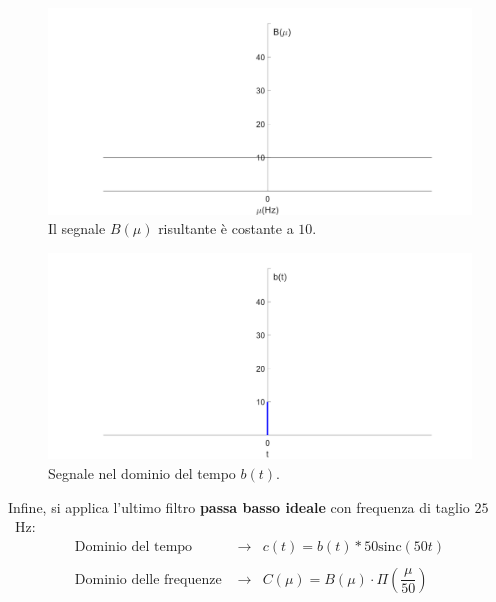 \documentclass[a4paper]{article}
\begin{document}
	\begin{figure}[!htp]
		\centering
		\includegraphics[width=\textwidth]{img/segnale_B.PNG}
		\caption*{Il segnale $B\left(\mu\right)$ risultante è costante a $10$.}
	\end{figure}
	
	\begin{figure}[!htp]
		\centering
		\includegraphics[width=\textwidth]{img/segnale_b-tempo.PNG}
		\caption*{Segnale nel dominio del tempo $b\left(t\right)$.}
	\end{figure}\newpage
	
	\noindent
	Infine, si applica l'ultimo filtro \textbf{passa basso ideale} con frequenza di taglio $25$~Hz:
	\begin{equation*}
		\begin{array}{lll}
			\text{Dominio del tempo } & \longrightarrow & c\left(t\right) = b\left(t\right) * 50\mathrm{sinc}\left(50t\right) \\
			&& \\
			\text{Dominio delle frequenze } & \longrightarrow & C\left(\mu\right) = B\left(\mu\right) \cdot \Pi\left(\dfrac{\mu}{50}\right)
		\end{array}
	\end{equation*}
	
\end{document}
